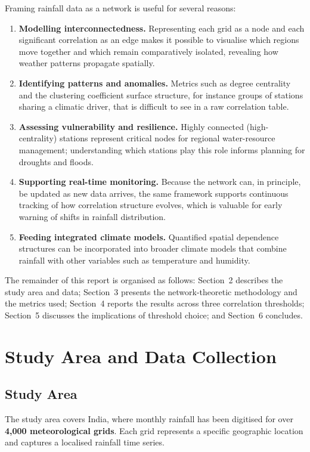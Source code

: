 \documentclass[11pt]{article}
\begin{document}
Framing rainfall data as a network is useful for several reasons:

\begin{enumerate}
  \item \textbf{Modelling interconnectedness.} Representing each grid as a node and each significant
  correlation as an edge makes it possible to visualise which regions move together and which remain
  comparatively isolated, revealing how weather patterns propagate spatially.
  \item \textbf{Identifying patterns and anomalies.} Metrics such as degree centrality and the
  clustering coefficient surface structure, for instance groups of stations sharing a climatic
  driver, that is difficult to see in a raw correlation table.
  \item \textbf{Assessing vulnerability and resilience.} Highly connected (high-centrality) stations
  represent critical nodes for regional water-resource management; understanding which stations play
  this role informs planning for droughts and floods.
  \item \textbf{Supporting real-time monitoring.} Because the network can, in principle, be updated as
  new data arrives, the same framework supports continuous tracking of how correlation structure
  evolves, which is valuable for early warning of shifts in rainfall distribution.
  \item \textbf{Feeding integrated climate models.} Quantified spatial dependence structures can be
  incorporated into broader climate models that combine rainfall with other variables such as
  temperature and humidity.
\end{enumerate}

The remainder of this report is organised as follows: Section~2 describes the study area and data;
Section~3 presents the network-theoretic methodology and the metrics used; Section~4 reports the
results across three correlation thresholds; Section~5 discusses the implications of threshold choice;
and Section~6 concludes.

\section{Study Area and Data Collection}

\subsection{Study Area}
The study area covers India, where monthly rainfall has been digitised for over \textbf{4,000
meteorological grids}. Each grid represents a specific geographic location and captures a localised
rainfall time series.
\end{document}
